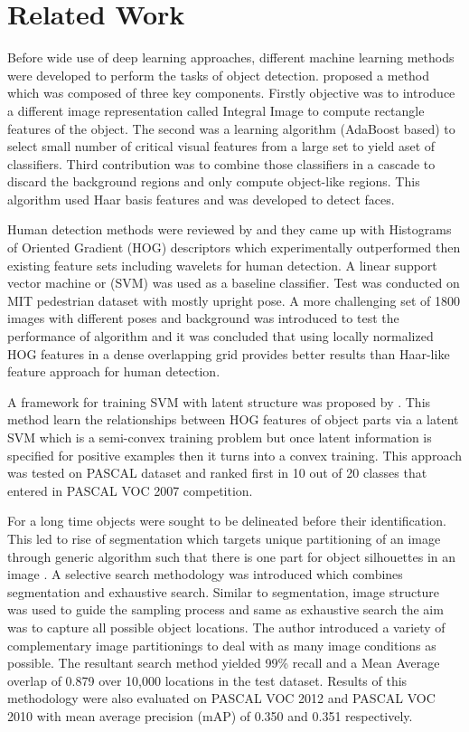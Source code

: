 \documentclass[11pt]{article}
\begin{document}
\section{Related Work}
Before wide use of deep learning approaches, different machine learning methods were developed to perform the tasks of object detection. \cite{viola2001rapid} proposed a method which was composed of three key components. Firstly objective was to introduce a different image representation called Integral Image to compute rectangle features of the object. The second was a learning algorithm (AdaBoost based) to select small number of critical visual features from a large set to yield aset of classifiers. Third contribution was to combine those classifiers in a cascade to discard the background regions and only compute object-like regions. This algorithm used Haar basis features and was developed to detect faces.

Human detection methods were reviewed by \cite{dalal2005histograms} and they came up with Histograms of Oriented Gradient (HOG) descriptors which experimentally outperformed then existing feature sets including wavelets for human detection. A linear support vector machine or (SVM) was used as a baseline classifier. Test was conducted on MIT pedestrian dataset with mostly upright pose. A more challenging set of 1800 images with different poses and background was introduced to test the performance of algorithm and it was concluded that using locally normalized HOG features in a dense overlapping grid provides better results than Haar-like feature approach for human detection.

A framework for training SVM with latent structure was proposed by \cite{felzenszwalb2008discriminatively}. This method learn the relationships between HOG features of object parts via a latent SVM which is a semi-convex training problem but once latent information is specified for positive examples then it turns into a convex training. This approach was tested on PASCAL dataset and ranked first in 10 out of 20 classes that entered in PASCAL VOC 2007 competition.

For a long time objects were sought to be delineated before their identification. This led to rise of segmentation which targets unique partitioning of an image through generic algorithm such that there is one part for object silhouettes in an image \cite{uijlings2013selective}. A selective search methodology was introduced which combines segmentation and exhaustive search. Similar to segmentation, image structure was used to guide the sampling process and same as exhaustive search the aim was to capture all possible object locations. The author introduced a variety of complementary image partitionings to deal with as many image conditions as possible. The resultant search method yielded 99\% recall and a Mean Average overlap of 0.879 over 10,000 locations in the test dataset. Results of this methodology were also evaluated on PASCAL VOC 2012 and PASCAL VOC 2010 with mean average precision (mAP) of 0.350 and 0.351 respectively.
\end{document}
